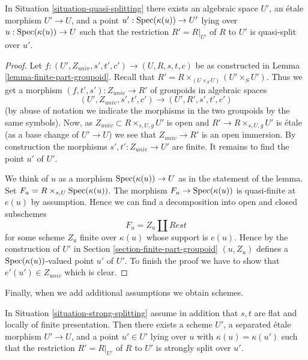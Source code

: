 \begin{lemma}
\label{lemma-quasi-splitting}
In Situation \ref{situation-quasi-splitting}
there exists an algebraic space $U'$, an \'etale morphism
$U' \to U$, and a point $u' : \mathop{\mathrm{Spec}}(\kappa(u)) \to U'$
lying over $u : \mathop{\mathrm{Spec}}(\kappa(u)) \to U$
such that the restriction $R' = R|_{U'}$ of $R$ to $U'$
is quasi-split over $u'$.
\end{lemma}

\begin{proof}
Let $f : (U', Z_{univ}, s', t', c') \to (U, R, s, t, c)$ be as constructed in
Lemma \ref{lemma-finite-part-groupoid}.
Recall that $R' = R \times_{(U \times_S U)} (U' \times_S U')$.
Thus we get a morphism $(f, t', s') : Z_{univ} \to R'$ of groupoids
in algebraic spaces
$$
(U', Z_{univ}, s', t', c') \to (U', R', s', t', c')
$$
(by abuse of notation we indicate the morphisms in the two groupoids
by the same symbols). Now, as $Z_{univ} \subset R \times_{s, U, g} U'$ is open
and $R' \to R \times_{s, U, g} U'$ is \'etale (as a base change
of $U' \to U$) we see that $Z_{univ} \to R'$ is an open immersion.
By construction the morphisms $s', t' : Z_{univ} \to U'$ are finite.
It remains to find the point $u'$ of $U'$.

\medskip\noindent
We think of $u$ as a morphism $\mathop{\mathrm{Spec}}(\kappa(u)) \to U$ as in
the statement of the lemma. Set $F_u = R \times_{s, U} \mathop{\mathrm{Spec}}(\kappa(u))$.
The morphism $F_u \to \mathop{\mathrm{Spec}}(\kappa(u))$ is quasi-finite at $e(u)$
by assumption. Hence we can find a decomposition into open and closed
subschemes
$$
F_u = Z_u \amalg Rest
$$
for some scheme $Z_u$ finite over $\kappa(u)$ whose support is $e(u)$.
Hence by the construction of $U'$ in
Section \ref{section-finite-part-groupoid}
$(u, Z_u)$ defines a $\mathop{\mathrm{Spec}}(\kappa(u))$-valued
point $u'$ of $U'$. To finish the proof we have to show that
$e'(u') \in Z_{univ}$ which is clear.
\end{proof}

\noindent
Finally, when we add additional assumptions we obtain schemes.

\begin{lemma}
\label{lemma-strong-splitting-scheme}
In Situation \ref{situation-strong-splitting} assume in addition that
$s, t$ are flat and locally of finite presentation.
Then there exists a scheme $U'$, a separated \'etale morphism
$U' \to U$, and a point $u' \in U'$
lying over $u$ with $\kappa(u) = \kappa(u')$
such that the restriction $R' = R|_{U'}$ of $R$ to $U'$
is strongly split over $u'$.
\end{lemma}

